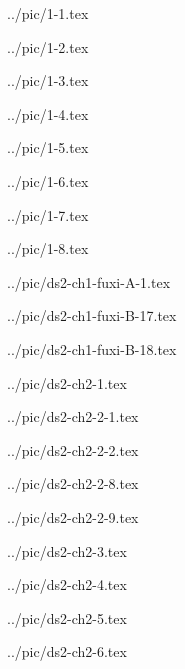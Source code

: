 

../pic/1-1.tex



../pic/1-2.tex



../pic/1-3.tex



../pic/1-4.tex



../pic/1-5.tex



../pic/1-6.tex



../pic/1-7.tex



../pic/1-8.tex



../pic/ds2-ch1-fuxi-A-1.tex



../pic/ds2-ch1-fuxi-B-17.tex



../pic/ds2-ch1-fuxi-B-18.tex



../pic/ds2-ch2-1.tex



../pic/ds2-ch2-2-1.tex



../pic/ds2-ch2-2-2.tex



../pic/ds2-ch2-2-8.tex



../pic/ds2-ch2-2-9.tex



../pic/ds2-ch2-3.tex



../pic/ds2-ch2-4.tex



../pic/ds2-ch2-5.tex



../pic/ds2-ch2-6.tex

